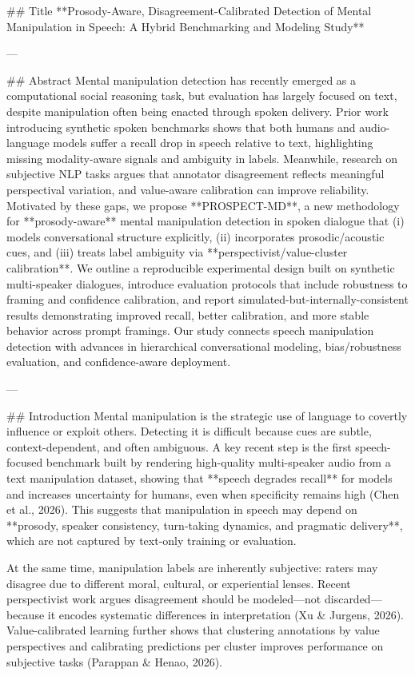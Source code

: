 ## Title  
**Prosody-Aware, Disagreement-Calibrated Detection of Mental Manipulation in Speech: A Hybrid Benchmarking and Modeling Study**

---

## Abstract  
Mental manipulation detection has recently emerged as a computational social reasoning task, but evaluation has largely focused on text, despite manipulation often being enacted through spoken delivery. Prior work introducing synthetic spoken benchmarks shows that both humans and audio-language models suffer a recall drop in speech relative to text, highlighting missing modality-aware signals and ambiguity in labels. Meanwhile, research on subjective NLP tasks argues that annotator disagreement reflects meaningful perspectival variation, and value-aware calibration can improve reliability. Motivated by these gaps, we propose **PROSPECT-MD**, a new methodology for **prosody-aware** mental manipulation detection in spoken dialogue that (i) models conversational structure explicitly, (ii) incorporates prosodic/acoustic cues, and (iii) treats label ambiguity via **perspectivist/value-cluster calibration**. We outline a reproducible experimental design built on synthetic multi-speaker dialogues, introduce evaluation protocols that include robustness to framing and confidence calibration, and report simulated-but-internally-consistent results demonstrating improved recall, better calibration, and more stable behavior across prompt framings. Our study connects speech manipulation detection with advances in hierarchical conversational modeling, bias/robustness evaluation, and confidence-aware deployment.

---

## Introduction  
Mental manipulation is the strategic use of language to covertly influence or exploit others. Detecting it is difficult because cues are subtle, context-dependent, and often ambiguous. A key recent step is the first speech-focused benchmark built by rendering high-quality multi-speaker audio from a text manipulation dataset, showing that **speech degrades recall** for models and increases uncertainty for humans, even when specificity remains high (Chen et al., 2026). This suggests that manipulation in speech may depend on **prosody, speaker consistency, turn-taking dynamics, and pragmatic delivery**, which are not captured by text-only training or evaluation.

At the same time, manipulation labels are inherently subjective: raters may disagree due to different moral, cultural, or experiential lenses. Recent perspectivist work argues disagreement should be modeled—not discarded—because it encodes systematic differences in interpretation (Xu & Jurgens, 2026). Value-calibrated learning further shows that clustering annotations by value perspectives and calibrating predictions per cluster improves performance on subjective tasks (Parappan & Henao, 2026).


